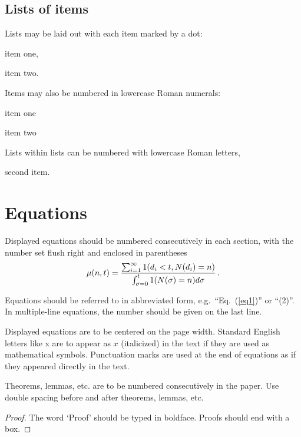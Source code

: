 \documentclass{ws-ijait}
\begin{document}
\subsection{Lists of items}

Lists may be laid out with each item marked by a dot:
\begin{itemlist}
\item item one,
\item item two.
\end{itemlist}
Items may also be numbered in lowercase Roman numerals:
\begin{romanlist}[(ii)]
\item item one
\item item two
\begin{romanlist}[(b)]
\item Lists within lists can be numbered with lowercase Roman letters,
\item second item.
\end{romanlist}
\end{romanlist}

\section{Equations}

Displayed equations should be numbered consecutively in each
section, with the number set flush right and enclosed
in parentheses
\begin{equation}
\mu(n, t) = {\sum^\infty_{i=1} 1(d_i < t, N(d_i) = n) \over
\int^t_{\sigma=0} 1(N(\sigma) = n)d\sigma}\,. \label{eq1}
\end{equation}

Equations should be referred to in abbreviated form,
e.g.~``Eq.~(\ref{eq1})'' or ``(2)''. In multiple-line
equations, the number should be given on the last line.

Displayed equations are to be centered on the page width.
Standard English letters like x are to appear as $x$
(italicized) in the text if they are used as mathematical
symbols. Punctuation marks are used at the end of equations as
if they appeared directly in the text.

\begin{theorem}
Theorems, lemmas, etc. are to be numbered
consecutively in the paper. Use double spacing before and after
theorems, lemmas, etc.
\end{theorem}

\begin{proof}
The word `Proof' should be typed in boldface. Proofs should end with
a box.
\end{proof}
\end{document}
